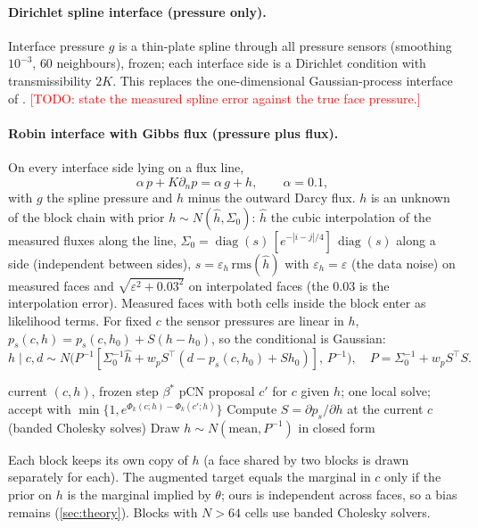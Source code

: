 \documentclass[11pt]{article}
\newcommand{\todo}[1]{\textcolor{red}{[TODO: #1]}}
\newcommand{\addmath}[1]{\iftoggle{annotations}{\par\noindent\textbf{\textcolor{annteal}{[Let's add more mathematical detail here\ifx\relax#1\relax\else: #1\fi]}}\par}{}}
\begin{document}
\paragraph{Dirichlet spline interface (pressure only).} Interface pressure $g$ is a thin-plate spline through all pressure sensors (smoothing $10^{-3}$, $60$ neighbours), frozen; each interface side is a Dirichlet condition with transmissibility $2K$. This replaces the one-dimensional Gaussian-process interface of \citet{XuLiaoLi2022}. \todo{state the measured spline error against the true face pressure.}

\paragraph{Robin interface with Gibbs flux (pressure plus flux).}
\addmath{derive the Gaussian conditional of $h$ given $c$ and the data from the linear map $S$} On every interface side lying on a flux line,
\begin{equation}
\alpha\,p+K\partial_np=\alpha\,g+h,\qquad \alpha=0.1,
\end{equation}
with $g$ the spline pressure and $h$ minus the outward Darcy flux. $h$ is an unknown of the block chain with prior $h\sim N(\hat h,\Sigma_0)$: $\hat h$ the cubic interpolation of the measured fluxes along the line, $\Sigma_0=\operatorname{diag}(s)\,[e^{-|i-j|/4}]\,\operatorname{diag}(s)$ along a side (independent between sides), $s=\varepsilon_h\,\mathrm{rms}(\hat h)$ with $\varepsilon_h=\varepsilon$ (the data noise) on measured faces and $\sqrt{\varepsilon^2+0.03^2}$ on interpolated faces (the $0.03$ is the interpolation error). Measured faces with both cells inside the block enter as likelihood terms. For fixed $c$ the sensor pressures are linear in $h$, $p_s(c,h)=p_s(c,h_0)+S(h-h_0)$, so the conditional is Gaussian:
\begin{equation}
h\mid c,d\sim N\bigl(P^{-1}[\Sigma_0^{-1}\hat h+w_pS^\top(d-p_s(c,h_0)+Sh_0)],\,P^{-1}\bigr),\quad P=\Sigma_0^{-1}+w_pS^\top S.
\end{equation}
\begin{algorithm}[h]
\caption{One iteration of a block chain with Robin interface and Gibbs flux}\label{alg:gibbs}
\begin{algorithmic}[1]
\Require current $(c,h)$, frozen step $\beta^\ast$
\State pCN proposal $c'$ for $c$ given $h$; one local solve; accept with $\min\{1,e^{\Phi_k(c;h)-\Phi_k(c';h)}\}$
\State Compute $S=\partial p_s/\partial h$ at the current $c$ (banded Cholesky solves)
\State Draw $h\sim N(\text{mean},P^{-1})$ in closed form
\end{algorithmic}
\end{algorithm}
Each block keeps its own copy of $h$ (a face shared by two blocks is drawn separately for each). The augmented target equals the marginal in $c$ only if the prior on $h$ is the marginal implied by $\theta$; ours is independent across faces, so a bias remains (\cref{sec:theory}). Blocks with $N>64$ cells use banded Cholesky solvers.
\end{document}
